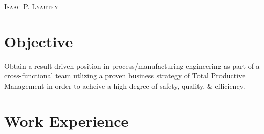 \documentclass[a4paper, oneside, final, fontsize=9pt, usegeometry]{scrartcl} %
\begin{document}

\begin{center} %


	{\fontsize{36}{36}\selectfont\scshape Isaac P. Lyautey}


	\section{Objective}
	\begin{center}
		Obtain a result driven position in process/manufacturing engineering as part of a cross-functional team utlizing a proven business strategy of Total Productive Management in order to acheive a high degree of safety, quality, \& efficiency.
	\end{center}

	\vspace{-12pt}


	\section{Work Experience}



\end{center}
\end{document}
